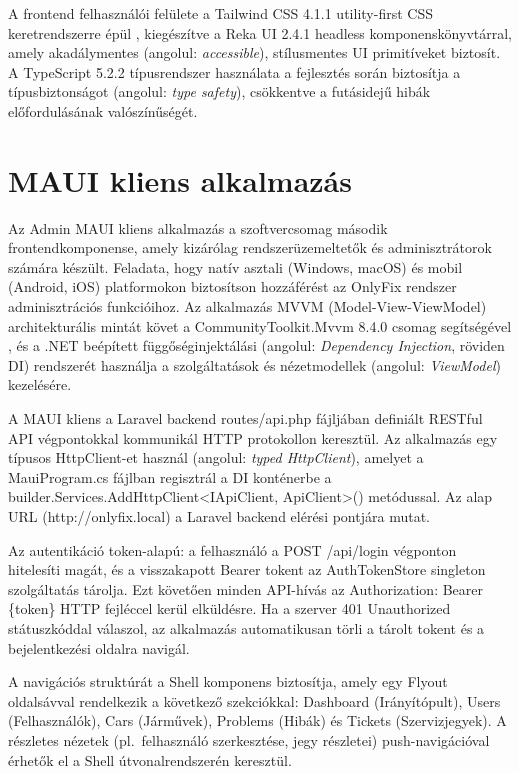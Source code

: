 \documentclass[colorlinks]{thesis-kando}
\begin{document}
A frontend felhasználói felülete a Tailwind CSS 4.1.1 utility-first CSS keretrendszerre épül \cite{ref7}, kiegészítve a Reka UI 2.4.1 headless komponenskönyvtárral, amely akadálymentes (angolul: \emph{accessible}), stílusmentes UI primitíveket biztosít. A TypeScript 5.2.2 típusrendszer használata a fejlesztés során biztosítja a típusbiztonságot (angolul: \emph{type safety}), csökkentve a futásidejű hibák előfordulásának valószínűségét.

\section{MAUI kliens alkalmazás}

Az Admin MAUI kliens alkalmazás a szoftvercsomag második frontendkomponense, amely kizárólag rendszerüzemeltetők és adminisztrátorok számára készült. Feladata, hogy natív asztali (Windows, macOS) és mobil (Android, iOS) platformokon biztosítson hozzáférést az OnlyFix rendszer adminisztrációs funkcióihoz. Az alkalmazás MVVM (Model-View-ViewModel) architekturális mintát követ a CommunityToolkit.Mvvm 8.4.0 csomag segítségével \cite{ref8}, és a .NET beépített függőséginjektálási (angolul: \emph{Dependency Injection}, röviden DI) rendszerét használja a szolgáltatások és nézetmodellek (angolul: \emph{ViewModel}) kezelésére.

A MAUI kliens a Laravel backend routes/api.php fájljában definiált RESTful API végpontokkal kommunikál HTTP protokollon keresztül. Az alkalmazás egy típusos HttpClient-et használ (angolul: \emph{typed HttpClient}), amelyet a MauiProgram.cs fájlban regisztrál a DI konténerbe a builder.Services.AddHttpClient<IApiClient, ApiClient>() metódussal. Az alap URL (http://onlyfix.local) a Laravel backend elérési pontjára mutat.

Az autentikáció token-alapú: a felhasználó a POST /api/login végponton hitelesíti magát, és a visszakapott Bearer tokent az AuthTokenStore singleton szolgáltatás tárolja. Ezt követően minden API-hívás az Authorization: Bearer \{token\} HTTP fejléccel kerül elküldésre. Ha a szerver 401 Unauthorized státuszkóddal válaszol, az alkalmazás automatikusan törli a tárolt tokent és a bejelentkezési oldalra navigál.

A navigációs struktúrát a Shell komponens biztosítja, amely egy Flyout oldalsávval rendelkezik a következő szekciókkal: Dashboard (Irányítópult), Users (Felhasználók), Cars (Járművek), Problems (Hibák) és Tickets (Szervizjegyek). A részletes nézetek (pl.\ felhasználó szerkesztése, jegy részletei) push-navigációval érhetők el a Shell útvonalrendszerén keresztül.
\end{document}
